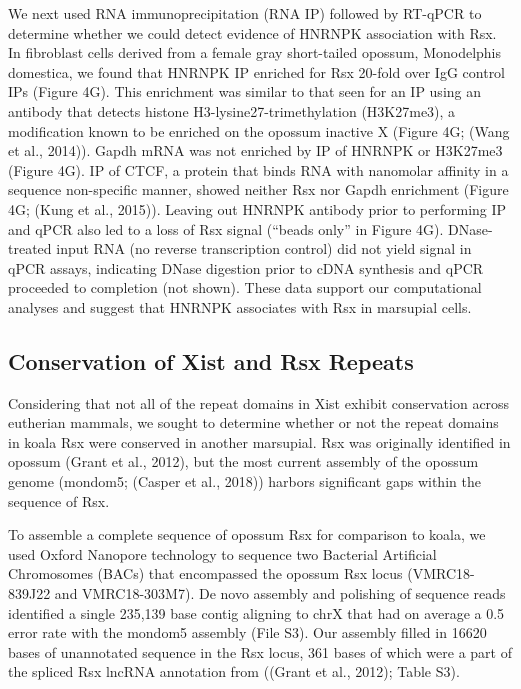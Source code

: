 We next used RNA immunoprecipitation (RNA IP) followed by RT-qPCR to determine whether we could detect evidence of HNRNPK association with Rsx. In fibroblast cells derived from a female gray short-tailed opossum, Monodelphis domestica, we found that HNRNPK IP enriched for Rsx 20-fold over IgG control IPs (Figure 4G). This enrichment was similar to that seen for an IP using an antibody that detects histone H3-lysine27-trimethylation (H3K27me3), a modification known to be enriched on the opossum inactive X (Figure 4G; (Wang et al., 2014)). Gapdh mRNA was not enriched by IP of HNRNPK or H3K27me3 (Figure 4G). IP of CTCF, a protein that binds RNA with nanomolar affinity in a sequence non-specific manner, showed neither Rsx nor Gapdh enrichment (Figure 4G; (Kung et al., 2015)). Leaving out HNRNPK antibody prior to performing IP and qPCR also led to a loss of Rsx signal (“beads only” in Figure 4G). DNase-treated input RNA (no reverse transcription control) did not yield signal in qPCR assays, indicating DNase digestion prior to cDNA synthesis and qPCR proceeded to completion (not shown). These data support our computational analyses and suggest that HNRNPK associates with Rsx in marsupial cells.

\subsection{Conservation of Xist and Rsx Repeats}
Considering that not all of the repeat domains in Xist exhibit conservation across eutherian mammals, we sought to determine whether or not the repeat domains in koala Rsx were conserved in another marsupial. Rsx was originally identified in opossum (Grant et al., 2012), but the most current assembly of the opossum genome (mondom5; (Casper et al., 2018)) harbors significant gaps within the sequence of Rsx. 

To assemble a complete sequence of opossum Rsx for comparison to koala, we used Oxford Nanopore technology to sequence two Bacterial Artificial Chromosomes (BACs) that encompassed the opossum Rsx locus (VMRC18-839J22 and VMRC18-303M7). De novo assembly and polishing of sequence reads identified a single 235,139 base contig aligning to chrX that had on average a 0.5 error rate with the mondom5 assembly (File S3). Our assembly filled in 16620 bases of unannotated sequence in the Rsx locus, 361 bases of which were a part of the spliced Rsx lncRNA annotation from ((Grant et al., 2012); Table S3).

